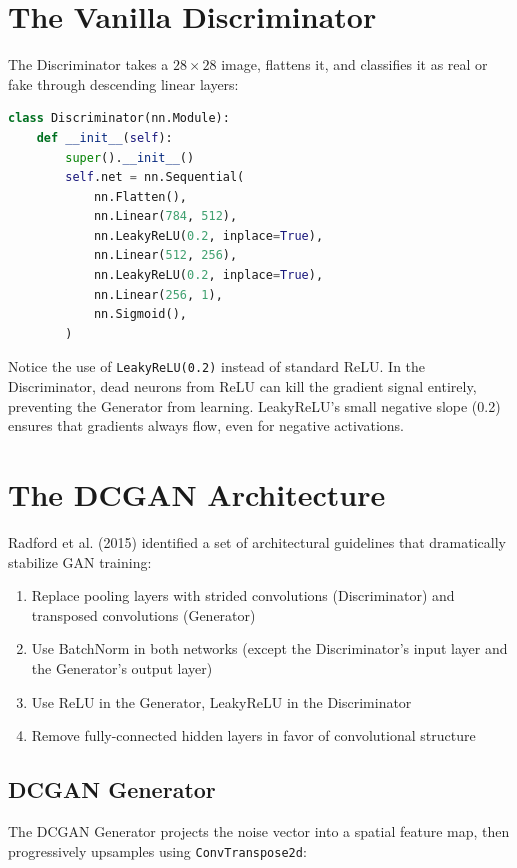 \documentclass[12pt]{article}
\begin{document}
\section{The Vanilla Discriminator}
The Discriminator takes a $28 \times 28$ image, flattens it, and classifies it as real or fake through descending linear layers:

\begin{lstlisting}[language=Python]
class Discriminator(nn.Module):
    def __init__(self):
        super().__init__()
        self.net = nn.Sequential(
            nn.Flatten(),
            nn.Linear(784, 512),
            nn.LeakyReLU(0.2, inplace=True),
            nn.Linear(512, 256),
            nn.LeakyReLU(0.2, inplace=True),
            nn.Linear(256, 1),
            nn.Sigmoid(),
        )
\end{lstlisting}

Notice the use of \texttt{LeakyReLU(0.2)} instead of standard ReLU. In the Discriminator, dead neurons from ReLU can kill the gradient signal entirely, preventing the Generator from learning. LeakyReLU's small negative slope (0.2) ensures that gradients always flow, even for negative activations.

\section{The DCGAN Architecture}
Radford et al. (2015) identified a set of architectural guidelines that dramatically stabilize GAN training:
\begin{enumerate}
    \item Replace pooling layers with strided convolutions (Discriminator) and transposed convolutions (Generator)
    \item Use BatchNorm in both networks (except the Discriminator's input layer and the Generator's output layer)
    \item Use ReLU in the Generator, LeakyReLU in the Discriminator
    \item Remove fully-connected hidden layers in favor of convolutional structure
\end{enumerate}

\subsection{DCGAN Generator}
The DCGAN Generator projects the noise vector into a spatial feature map, then progressively upsamples using \texttt{ConvTranspose2d}:
\end{document}
